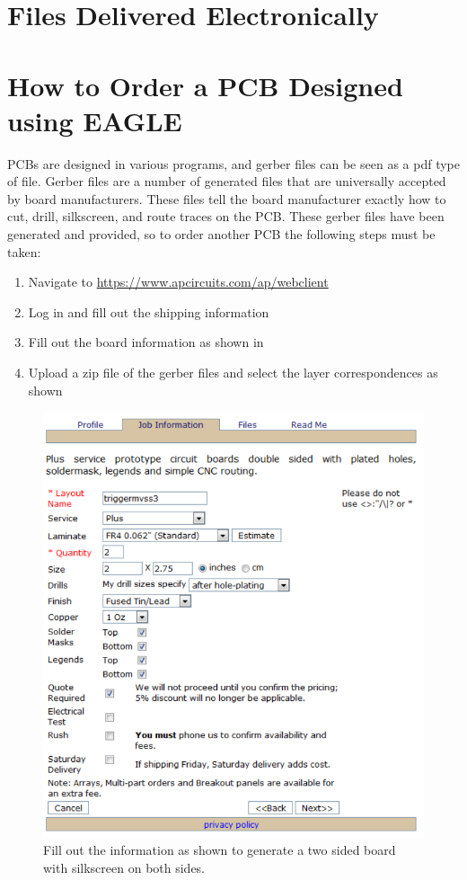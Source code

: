 \documentclass{report}
\begin{document}
	\chapter{Files Delivered Electronically}
		

	\chapter{How to Order a PCB Designed using EAGLE}
	PCBs are designed in various programs, and gerber files can be seen as a pdf type of file.  Gerber files are a number of generated files that are universally accepted by board manufacturers.  These files tell the board manufacturer exactly how to cut, drill, silkscreen, and route traces on the PCB. These gerber files have been generated and provided, so to order another PCB the following steps must be taken:
	
	\begin{enumerate}
		\item Navigate to \url{https://www.apcircuits.com/ap/webclient}
		\item Log in and fill out the shipping information
		\item Fill out the board information as shown in 
		\item Upload a zip file of the gerber files and select the layer correspondences as shown 
	\end{enumerate}
	
	\begin{figure}[H]
		\centering
		\includegraphics[scale = 0.7]{../figures/PCBorder1.PNG}
		\caption{Fill out the information as shown to generate a two sided board with silkscreen on both sides.}
		\label{fig:pinouts}
	\end{figure}
	
\end{document}
